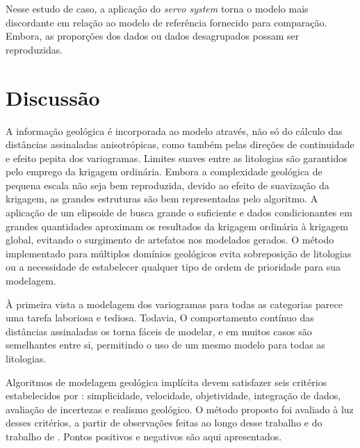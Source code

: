 Nesse estudo de caso, a aplicação do \textit{servo system} torna o modelo mais discordante em relação ao modelo de referência fornecido para comparação. Embora, as proporções dos dados ou dados desagrupados possam ser reproduzidas.

\section{Discussão}

A informação geológica é incorporada ao modelo através, não só do cálculo das distâncias assinaladas anisotrópicas, como também pelas direções de continuidade e efeito pepita dos variogramas. Limites suaves entre as litologias são garantidos pelo emprego da krigagem ordinária. Embora a complexidade geológica de pequena escala não seja bem reproduzida, devido ao efeito de suavização da krigagem, as grandes estruturas são bem representadas pelo algoritmo. A aplicação de um elipsoide de busca grande o suficiente e dados condicionantes em grandes quantidades aproximam os resultados da krigagem ordinária à krigagem global, evitando o surgimento de artefatos nos modelados gerados. O método implementado para múltiplos domínios geológicos evita sobreposição de litologias ou a necessidade de estabelecer qualquer tipo de ordem de prioridade para sua modelagem.

À primeira vista a modelagem dos variogramas para todas as categorias parece uma tarefa laboriosa e tediosa. Todavia, O comportamento contínuo das distâncias assinaladas os torna fáceis de modelar, e em muitos casos são semelhantes entre si, permitindo o uso de um mesmo modelo para todas as litologias. 

Algoritmos de modelagem geológica implícita devem satisfazer seis critérios estabelecidos por : simplicidade, velocidade, objetividade, integração de dados, avaliação de incertezas e realismo geológico. O método proposto foi avaliado à luz desses critérios, a partir de observações feitas ao longo desse trabalho e do trabalho de . Pontos positivos e negativos são aqui apresentados.


